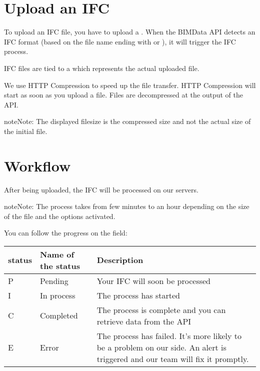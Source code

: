 \documentclass[a4paper,12pt,english]{sphinxmanual}
\begin{document}
\section{Upload an IFC}
\label{\detokenize{ifc:upload-an-ifc}}
To upload an IFC file, you have to upload a .
When the BIMData API detects an IFC format (based on the file name ending with  or ), it will trigger the IFC process.

IFC files are tied to a  which represents the actual uploaded file.

We use HTTP Compression to speed up the file transfer. HTTP Compression will start as soon as you upload a file.
Files are decompressed at the output of the API.

\begin{sphinxadmonition}{note}{Note:}
The displayed filesize is the compressed size and not the actual size of the initial file.
\end{sphinxadmonition}


\section{Workflow}
\label{\detokenize{ifc:workflow}}
After being uploaded, the IFC will be processed on our servers.

\begin{sphinxadmonition}{note}{Note:}
The process takes from few minutes to an hour depending on the size of the file and the options activated.
\end{sphinxadmonition}

You can follow the progress on the  field:


\begin{savenotes}\sphinxattablestart
\centering
\begin{tabulary}{\linewidth}[t]{|T|T|T|}
\hline
\sphinxstyletheadfamily 
status
&\sphinxstyletheadfamily 
Name of the status
&\sphinxstyletheadfamily 
Description
\\
\hline
P
&
Pending
&
Your IFC will soon be processed
\\
\hline
I
&
In process
&
The process has started
\\
\hline
C
&
Completed
&
The process is complete and you can retrieve data from the API
\\
\hline
E
&
Error
&
The process has failed.
It’s more likely to be a problem on our side.
An alert is triggered and our team will fix it promptly.
\\
\hline
\end{tabulary}
\par
\sphinxattableend\end{savenotes}
\end{document}
